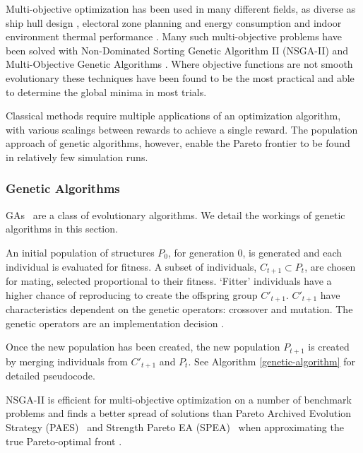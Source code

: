 \documentclass[12pt,doublespacing,a4paper]{ouparticle}
\begin{document}
Multi-objective optimization has been used in many different fields, as diverse as ship hull design \cite{Guha2015}, electoral zone planning \cite{Ponsich2017} and energy consumption and indoor environment thermal performance \cite{Yu2015a}. Many such multi-objective problems have been solved with Non-Dominated Sorting Genetic Algorithm II (NSGA-II) \cite{Valkanas2014} and Multi-Objective Genetic Algorithms \cite{T.MurataandH.Ishibuchi1995}. Where objective functions are not smooth evolutionary these techniques have been found to be the most practical and able to determine the global minima in most trials.

Classical methods require multiple applications of an optimization algorithm, with various scalings between rewards to achieve a single reward. The population approach of genetic algorithms, however, enable the Pareto frontier to be found in relatively few simulation runs.

\subsubsection{Genetic Algorithms}
GAs~\cite{Holland1975} are a class of evolutionary algorithms. We detail the workings of genetic algorithms in this section.

An initial population of structures $P_{0}$, for generation 0, is generated and each individual is evaluated for fitness. A subset of individuals, $C_{t+1} \subset P_{t}$, are chosen for mating, selected proportional to their fitness. `Fitter' individuals have a higher chance of reproducing to create the offspring group $C'_{t+1}$. $C'_{t+1}$ have characteristics dependent on the genetic operators: crossover and mutation. The genetic operators are an implementation decision \cite{FogelDavidB2009}. 

Once the new population has been created, the new population $P_{t+1}$ is created by merging individuals from $C'_{t+1}$ and $P_{t}$. See Algorithm \ref{genetic-algorithm} for detailed pseudocode.


NSGA-II is efficient for multi-objective optimization on a number of benchmark problems and finds a better spread of solutions than Pareto Archived Evolution Strategy (PAES)~\cite{Knowles1999} and Strength Pareto EA (SPEA)~\cite{Zitzler2006} when approximating the true Pareto-optimal front \cite{Valkanas2014}.
\end{document}
